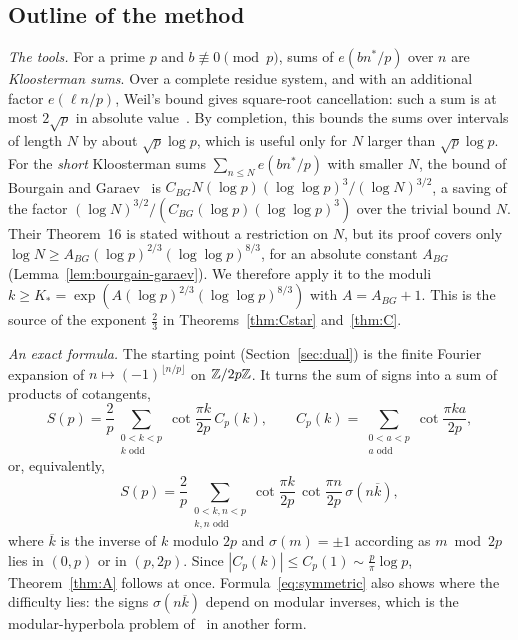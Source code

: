 \subsection{Outline of the method}\label{subsec:outline}
\emph{The tools.} For a prime $p$ and $b\not\equiv0\pmod p$, sums of $e(bn^*/p)$ over $n$ are \emph{Kloosterman sums}. Over a complete residue system, and with an additional factor $e(\ell n/p)$, Weil's bound gives square-root cancellation: such a sum is at most $2\sqrt p$ in absolute value~\cite{b29}. By completion, this bounds the sums over intervals of length $N$ by about $\sqrt p\log p$, which is useful only for $N$ larger than $\sqrt p\log p$. For the \emph{short} Kloosterman sums $\sum_{n\le N}e(bn^*/p)$ with smaller $N$, the bound of Bourgain and Garaev~\cite{b8} is $C_{BG}N(\log p)(\log\log p)^3/(\log N)^{3/2}$, a saving of the factor $(\log N)^{3/2}/(C_{BG}(\log p)(\log\log p)^3)$ over the trivial bound $N$. Their Theorem~16 is stated without a restriction on $N$, but its proof covers only $\log N\ge A_{BG}(\log p)^{2/3}(\log\log p)^{8/3}$, for an absolute constant $A_{BG}$ (Lemma~\ref{lem:bourgain-garaev}). We therefore apply it to the moduli $k\ge K_*=\exp(A(\log p)^{2/3}(\log\log p)^{8/3})$ with $A=A_{BG}+1$. This is the source of the exponent $\frac23$ in Theorems~\ref{thm:Cstar} and~\ref{thm:C}.

\emph{An exact formula.} The starting point (Section~\ref{sec:dual}) is the finite Fourier expansion of $n\mapsto(-1)^{\lfloor n/p\rfloor}$ on $\mathbb{Z}/2p\mathbb{Z}$. It turns the sum of signs into a sum of products of cotangents,
\begin{equation}\label{eq:dual-intro}
S(p)=\frac2p\sum_{\substack{0<k<p\\ k\text{ odd}}}\cot\frac{\pi k}{2p}\,C_p(k),\qquad C_p(k)=\sum_{\substack{0<a<p\\ a\text{ odd}}}\cot\frac{\pi ka}{2p},
\end{equation}
or, equivalently,
\begin{equation}\label{eq:symmetric}
S(p)=\frac2p\sum_{\substack{0<k,n<p\\ k,n\text{ odd}}}\cot\frac{\pi k}{2p}\,\cot\frac{\pi n}{2p}\,\sigma(n\overline k),
\end{equation}
where $\overline k$ is the inverse of $k$ modulo $2p$ and $\sigma(m)=\pm1$ according as $m\bmod2p$ lies in $(0,p)$ or in $(p,2p)$. Since $|C_p(k)|\le C_p(1)\sim\frac p\pi\log p$, Theorem~\ref{thm:A} follows at once. Formula~\eqref{eq:symmetric} also shows where the difficulty lies: the signs $\sigma(n\overline k)$ depend on modular inverses, which is the modular-hyperbola problem of~\cite{b1} in another form.

